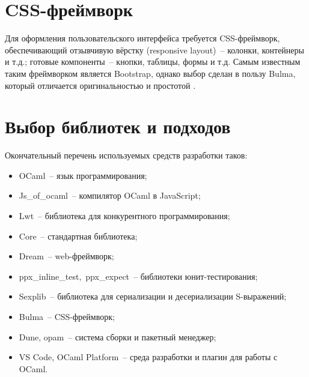 \section{CSS-фреймворк}

Для оформления пользовательского интерфейса требуется CSS-фреймворк, обеспечивающий
отзывчивую вёрстку (responsive layout)~-- колонки, контейнеры и т.д.;
готовые компоненты~-- кнопки, таблицы, формы и т.д. Самым известным таким фреймворком является Bootstrap,
однако выбор сделан в пользу Bulma, который отличается оригинальностью и простотой \cite{bulma-vs-bootstrap}.

\section{Выбор библиотек и подходов}

Окончательный перечень используемых средств разработки таков:

\begin{itemize}
      \item OCaml~-- язык программирования;
      \item Js\_of\_ocaml~-- компилятор OCaml в JavaScript;
      \item Lwt~-- библиотека для конкурентного программирования;
      \item Core~-- стандартная библиотека;
      \item Dream~-- web-фреймворк;
      \item ppx\_inline\_test,~ppx\_expect~-- библиотеки юнит-тестирования;
      \item Sexplib~-- библиотека для сериализации и десериализации S-выражений;
      \item Bulma~-- CSS-фреймворк;
      \item Dune, opam~-- система сборки и пакетный менеджер;
      \item VS Code, OCaml Platform~-- среда разработки и плагин для работы с OCaml.
\end{itemize}
